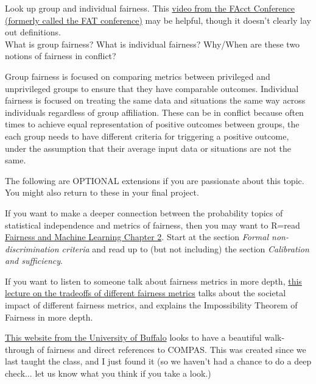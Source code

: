 \documentclass[assignment03_Solutions]{subfiles}
\begin{document}
\begin{exercise}
Look up group and individual fairness. This \href{https://www.youtube.com/watch?v=kok73C50RLA}{video from the FAcct Conference (formerly called the FAT conference)} may be helpful, though it doesn't clearly lay out definitions. \\

What is group fairness? What is individual fairness? Why/When are these two notions of fairness in conflict?
\begin{boxedsolution}
Group fairness is focused on comparing metrics between privileged and unprivileged groups to ensure that they have comparable outcomes. Individual fairness is focused on treating the same data and situations the same way across individuals regardless of group affiliation. These can be in conflict because often times to achieve equal representation of positive outcomes between groups, the each group needs to have different criteria for triggering a positive outcome, under the assumption that their average input data or situations are not the same.
\end{boxedsolution}
\end{exercise}

\begin{externalresources}
The following are OPTIONAL extensions if you are passionate about this topic. You might also return to these in your final project.

\bes
\item If you want to make a deeper connection between the probability topics of statistical independence and metrics of fairness, then you may want to R=read \href{https://fairmlbook.org/classification.html}{Fairness and Machine Learning Chapter 2}.  Start at the section \emph{Formal non-discrimination criteria} and read up to (but not including) the section \emph{Calibration and sufficiency}.

\item If you want to listen to someone talk about fairness metrics in more depth, \href{https://www.youtube.com/watch?v=jIXIuYdnyyk}{this lecture on the tradeoffs of different fairness metrics} talks about the societal impact of different fairness metrics, and explains the Impossibility Theorem of Fairness in more depth.

\item \href{http://www-student.cse.buffalo.edu/~atri/algo-and-society/support/notes/fairness/index.html}{This website from the University of Buffalo} looks to have a beautiful walk-through of fairness and direct references to COMPAS. This was created since we last taught the class, and I just found it (so we haven't had a chance to do a deep check... let us know what you think if you take a look.)
\ees
\end{externalresources}
\end{document}
